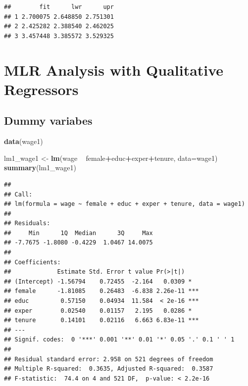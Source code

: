\documentclass[]{book}
\newenvironment{Shaded}{\begin{snugshade}}{\end{snugshade}}
\newcommand{\DataTypeTok}[1]{\textcolor[rgb]{0.13,0.29,0.53}{#1}}
\newcommand{\KeywordTok}[1]{\textcolor[rgb]{0.13,0.29,0.53}{\textbf{#1}}}
\newcommand{\NormalTok}[1]{#1}
\newcommand{\OperatorTok}[1]{\textcolor[rgb]{0.81,0.36,0.00}{\textbf{#1}}}
\newcommand{\StringTok}[1]{\textcolor[rgb]{0.31,0.60,0.02}{#1}}
\begin{document}
\begin{verbatim}
##        fit      lwr      upr
## 1 2.700075 2.648850 2.751301
## 2 2.425282 2.388540 2.462025
## 3 3.457448 3.385572 3.529325
\end{verbatim}

\hypertarget{mlr-analysis-with-qualitative-regressors}{%
\section{MLR Analysis with Qualitative Regressors}\label{mlr-analysis-with-qualitative-regressors}}

\hypertarget{dummy-variabes}{%
\subsection{Dummy variabes}\label{dummy-variabes}}

\begin{Shaded}
\begin{Highlighting}[]
\KeywordTok{data}\NormalTok{(wage1)}
\end{Highlighting}
\end{Shaded}

\begin{Shaded}
\begin{Highlighting}[]
\NormalTok{lm1_wage1 <-}\StringTok{ }\KeywordTok{lm}\NormalTok{(wage }\OperatorTok{~}\StringTok{ }\NormalTok{female}\OperatorTok{+}\NormalTok{educ}\OperatorTok{+}\NormalTok{exper}\OperatorTok{+}\NormalTok{tenure, }\DataTypeTok{data=}\NormalTok{wage1)}
\KeywordTok{summary}\NormalTok{(lm1_wage1)}
\end{Highlighting}
\end{Shaded}

\begin{verbatim}
## 
## Call:
## lm(formula = wage ~ female + educ + exper + tenure, data = wage1)
## 
## Residuals:
##     Min      1Q  Median      3Q     Max 
## -7.7675 -1.8080 -0.4229  1.0467 14.0075 
## 
## Coefficients:
##             Estimate Std. Error t value Pr(>|t|)    
## (Intercept) -1.56794    0.72455  -2.164   0.0309 *  
## female      -1.81085    0.26483  -6.838 2.26e-11 ***
## educ         0.57150    0.04934  11.584  < 2e-16 ***
## exper        0.02540    0.01157   2.195   0.0286 *  
## tenure       0.14101    0.02116   6.663 6.83e-11 ***
## ---
## Signif. codes:  0 '***' 0.001 '**' 0.01 '*' 0.05 '.' 0.1 ' ' 1
## 
## Residual standard error: 2.958 on 521 degrees of freedom
## Multiple R-squared:  0.3635, Adjusted R-squared:  0.3587 
## F-statistic:  74.4 on 4 and 521 DF,  p-value: < 2.2e-16
\end{verbatim}
\end{document}
